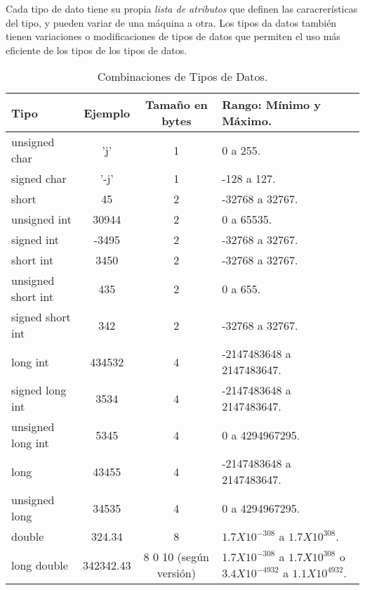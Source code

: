 Cada tipo de dato tiene su propia \textit{lista de atributos}  que definen las caracrerísticas del tipo, y pueden variar de una máquina a otra. Los tipos da datos también tienen variaciones o modificaciones de tipos de datos que permiten el uso más eficiente de los tipos de los tipos de datos. 


\begin{table}[H]
	\centering
 \begin{tabular}{l | c | c | l }
\hline
Tipo & Ejemplo & Tamaño en bytes & Rango: Mínimo y Máximo.\\ \hline
unsigned char& 'j' & 1 & 0 a 255. \\ \hline
signed char&'-j' & 1 & -128 a 127.\\\hline
short & 45 & 2 & -32768 a 32767. \\ \hline
unsigned int & 30944 & 2 & 0 a 65535. \\ \hline
signed int & -3495 & 2 & -32768 a 32767. \\ \hline
short int & 3450 & 2 & -32768 a 32767. \\ \hline
unsigned short int & 435 & 2 & 0 a 655. \\ \hline
signed short int & 342 & 2 & -32768 a 32767. \\ \hline
long int & 434532 & 4 &	-2147483648 a 2147483647. \\ \hline
signed long int	& 3534 & 4 & -2147483648 a 2147483647. \\ \hline
unsigned long int & 5345 & 4 & 0 a 4294967295. \\ \hline 
long & 43455 & 4 & -2147483648 a 2147483647. \\ \hline
unsigned long & 34535 & 4 & 0 a 4294967295. \\ \hline
double & 324.34 & 8 & $1.7X{10}^{-308}$ a $1.7X{10}^{308}$. \\ \hline
long double & 342342.43 & 8 0 10 (según versión) & $1.7X{10}^{-308}$ a $1.7X{10}^{308}$   o   $3.4X{10}^{-4932}$ a $1.1X{10}^{4932}$. \\ 
\hline
\end{tabular}
\\
\caption{\label{tab:Combinaciones de tipos de datos}Combinaciones de Tipos de Datos.}
\end{table} 
\\
\pagebreak 

